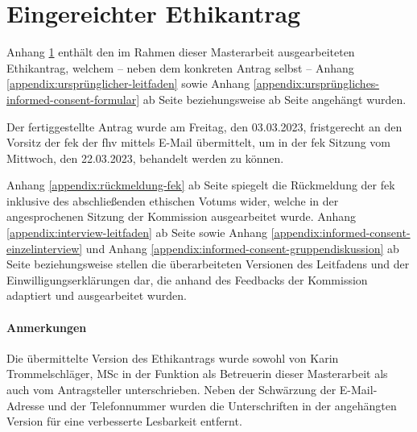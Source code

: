 \documentclass[a4paper,12pt,twoside,numbers=noendperiod]{scrreprt}
\begin{document}
\appendix

\cleardoublepage
\chapter{Eingereichter Ethikantrag}
\label{appendix:eingereichter-ethikantrag}

Anhang \ref{appendix:eingereichter-ethikantrag} enthält den im Rahmen dieser Masterarbeit ausgearbeiteten Ethikantrag, welchem -- neben dem konkreten Antrag selbst -- Anhang \ref{appendix:ursprünglicher-leitfaden} sowie Anhang \ref{appendix:ursprüngliches-informed-consent-formular} ab Seite \pageref{appendix:ursprünglicher-leitfaden} beziehungsweise ab Seite \pageref{appendix:ursprüngliches-informed-consent-formular} angehängt wurden.

Der fertiggestellte Antrag wurde am Freitag, den 03.03.2023, fristgerecht an den Vorsitz der \acl{fek} der \acl{fhv} mittels E-Mail übermittelt, um in der \ac{fek} Sitzung vom Mittwoch, den 22.03.2023, behandelt werden zu können.

\medskip 

Anhang \ref{appendix:rückmeldung-fek} ab Seite \pageref{appendix:rückmeldung-fek} spiegelt die Rückmeldung der \ac{fek} inklusive des abschließenden ethischen Votums wider, welche in der angesprochenen Sitzung der Kommission ausgearbeitet wurde. Anhang \ref{appendix:interview-leitfaden} ab Seite \pageref{appendix:interview-leitfaden} sowie Anhang \ref{appendix:informed-consent-einzelinterview} und Anhang \ref{appendix:informed-consent-gruppendiskussion} ab Seite \pageref{appendix:informed-consent-einzelinterview} beziehungsweise \pageref{appendix:informed-consent-gruppendiskussion} stellen die überarbeiteten Versionen des Leitfadens und der Einwilligungserklärungen dar, die anhand des Feedbacks der Kommission adaptiert und ausgearbeitet wurden.

\subsubsection*{Anmerkungen}
\label{appendix:anmerkungen-eingereichter-ethikantrag}
Die übermittelte Version des Ethikantrags wurde sowohl von Karin Trommelschläger, MSc in der Funktion als Betreuerin dieser Masterarbeit als auch vom Antragsteller unterschrieben. Neben der Schwärzung der E-Mail-Adresse und der Telefonnummer wurden die Unterschriften in der angehängten Version für eine verbesserte Lesbarkeit entfernt.


\end{document}
